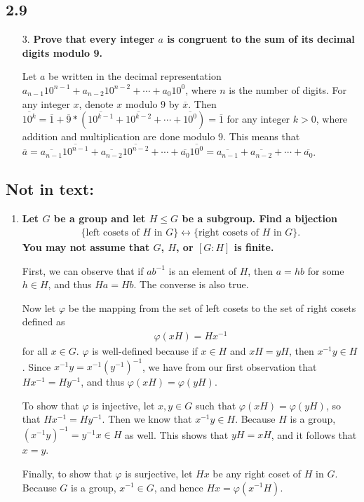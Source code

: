 \documentclass[a4paper,12pt]{article}
\begin{document}
\subsection*{2.9}
\begin{enumerate}
    \item[3.]
        \boldmath
        \textbf{Prove that every integer $a$ is congruent to the sum of its decimal digits modulo 9.} \par
        \unboldmath
        Let $a$ be written in the decimal representation $a_{n - 1} 10^{n - 1} + a_{n - 2} 10^{n - 2} + \cdots + a_0 10^0$, where $n$ is the number of digits. For any integer $x$, denote $x$ modulo $9$ by $\overline{x}$. Then $\overline{10^k} = \overline{1} + \overline{9} * (\overline{10^{k - 1}} + \overline{10^{k - 2}} + \cdots + \overline{10^0}) = \overline{1}$ for any integer $k > 0$, where addition and multiplication are done modulo 9. This means that $\overline{a} = \overline{a_{n - 1}} \overline{10^{n - 1}} + \overline{a_{n - 2}} \overline{10^{n - 2}} + \cdots + \overline{a_0} \overline{10^0} = \overline{a_{n - 1}} + \overline{a_{n - 2}} + \cdots + \overline{a_0}$.
\end{enumerate}

\subsection*{Not in text:}
\begin{enumerate}
    \item
        \boldmath
        \textbf{Let $G$ be a group and let $H \leq G$ be a subgroup. Find a bijection
        \begin{gather*}
            \{ \text{left cosets of $H$ in $G$} \} \longleftrightarrow \{ \text{right cosets of $H$ in $G$} \}.
        \end{gather*}
        You may not assume that $G$, $H$, or $[G:H]$ is finite.} \par
        \unboldmath
        First, we can observe that if $ab^{-1}$ is an element of $H$, then $a = hb$ for some $h \in H$, and thus $Ha = Hb$. The converse is also true. \par
        Now let $\varphi$ be the mapping from the set of left cosets to the set of right cosets defined as
        \begin{align*}
            \varphi(xH) = Hx^{-1}
        \end{align*}
        for all $x \in G$. $\varphi$ is well-defined because if $x \in H$ and $xH = yH$, then $x^{-1} y \in H$. Since $x^{-1} y = x^{-1} \left( y^{-1} \right)^{-1}$, we have from our first observation that $Hx^{-1} = Hy^{-1}$, and thus $\varphi(xH) = \varphi(yH)$. \par
        To show that $\varphi$ is injective, let $x, y \in G$ such that $\varphi(xH) = \varphi(yH)$, so that $Hx^{-1} = Hy^{-1}$. Then we know that $x^{-1}y \in H$. Because $H$ is a group, $(x^{-1}y)^{-1} = y^{-1}x \in H$ as well. This shows that $yH = xH$, and it follows that $x = y$. \par
        Finally, to show that $\varphi$ is surjective, let $Hx$ be any right coset of $H$ in $G$. Because $G$ is a group, $x^{-1} \in G$, and hence $Hx = \varphi(x^{-1}H)$.
\end{enumerate}
\end{document}
